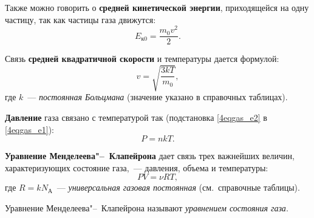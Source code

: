 \documentclass[main.tex]{subfiles}
\begin{document}
Также можно говорить о \textbf{средней кинетической энергии}, приходящейся на одну частицу, так как частицы газа движутся:
\begin{equation}
    E_\text{к0}=\frac{m_0v^2}{2}.
\end{equation}

Связь \textbf{средней квадратичной скорости} и температуры дается формулой:
\begin{equation}
    \label{4eqgas_e2}
    v=\sqrt{\frac{3kT}{m_0}},
\end{equation}
где $k$~--- \emph{постоянная Больцмана} (значение указано в справочных таблицах).


\textbf{Давление} газа связано с температурой так (подстановка \eqref{4eqgas_e2} в \eqref{4eqgas_e1}): 
\begin{equation}
    P=nkT.
\end{equation}

\textbf{Уравнение Менделеева"--~Клапейрона} дает связь трех важнейших величин, характеризующих состояние газа,~--- давления, объема и температуры:
\begin{equation}
    PV=\nu RT,
\end{equation}
где
$R=kN_\text{А}$~--- \emph{универсальная газовая постоянная} (см.~справочные таблицы).


Уравнение Менделеева"--~Клапейрона называют \emph{уравнением состояния газа}.



 
\end{document}
